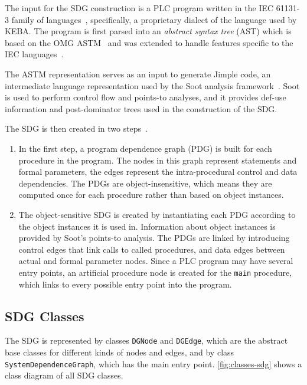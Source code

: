 The input for the SDG construction is a PLC program written in the IEC 61131-3 family of 
languages~\cite{IEC61131:2003}, specifically, a proprietary dialect of the language used by KEBA. The program is first 
parsed into an \emph{abstract syntax tree} (AST) which is based on the OMG ASTM~\cite{ASTM} and was extended to handle 
features specific to the IEC languages~\cite[ch.~4]{GrimmerDA}. 

The ASTM representation serves as an input to generate Jimple code, an intermediate language representation used by the 
Soot analysis framework~\cite{Soot}. Soot is used to perform control flow and points-to analyses, and it provides 
def-use information and post-dominator trees used in the construction of the SDG.

The SDG is then created in two steps~\cite[ch.~6]{GrimmerDA}.

\begin{enumerate}
  \item In the first step, a program dependence graph (PDG) is built for each procedure in the program. The nodes in 
  this graph represent statements and formal parameters, the edges represent the intra-procedural control and data 
  dependencies. The PDGs are object-insensitive, which means they are computed once for each procedure rather than 
  based on object instances.
  
  \item The object-sensitive SDG is created by instantiating each PDG according to the object instances 
  it is used in. Information about object instances is provided by Soot's points-to analysis. The PDGs are linked by 
  introducing control edges that link calls to called procedures, and data edges between actual and formal parameter 
  nodes. Since a PLC program may have several entry points, an artificial procedure node is created for the 
  \lstinline|main| procedure, which links to every possible entry point into the program.
\end{enumerate}

\subsection{SDG Classes} \label{sec:classes}

The SDG is represented by classes \lstinline|DGNode| and \lstinline|DGEdge|, which are the abstract base classes for 
different kinds of nodes and edges, and by class \lstinline|SystemDependenceGraph|, which has the main entry point. 
\autoref{fig:classes-sdg} shows a class diagram of all SDG classes.

